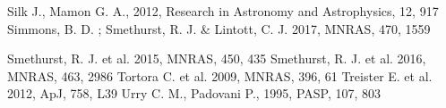 \documentclass[11pt]{article}
\begin{document}
\begin{thebibliography}{}
{\begin{minipage}[t]{0.3\textwidth}
 Silk J., Mamon G. A., 2012, Research in Astronomy and Astrophysics, 12, 917
 Simmons, B. D. ; Smethurst, R. J. \& Lintott, C. J. 2017, MNRAS, 470, 1559 
\end{minipage}
\hspace{0.5cm}
\begin{minipage}[t]{0.3\textwidth}
 Smethurst, R. J. et al. 2015, MNRAS, 450, 435
 Smethurst, R. J. et al. 2016, MNRAS, 463, 2986
 Tortora C. et al. 2009, MNRAS, 396, 61
 Treister E. et al. 2012, ApJ, 758, L39
 Urry C. M., Padovani P., 1995, PASP, 107, 803

\end{minipage}
\par}
\end{thebibliography}
\end{document}

